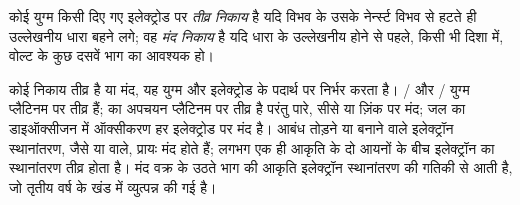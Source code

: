 \begin{definition}[तीव्र और मंद निकाय]\label{def:b2:current-potential-curves:fast-slow}
कोई युग्म किसी दिए गए इलेक्ट्रोड पर \emph{तीव्र निकाय} है यदि
विभव के उसके नेर्न्स्ट विभव से हटते ही उल्लेखनीय धारा बहने लगे;
वह \emph{मंद निकाय} है यदि धारा के उल्लेखनीय होने से पहले, किसी भी
दिशा में, वोल्ट के कुछ दसवें भाग का  आवश्यक हो।
\end{definition}

कोई निकाय तीव्र है या मंद, यह युग्म और इलेक्ट्रोड के पदार्थ
पर निर्भर करता है। / और / युग्म प्लैटिनम पर
तीव्र हैं;  का अपचयन प्लैटिनम पर तीव्र है परंतु पारे,
सीसे या ज़िंक पर मंद; जल का डाइऑक्सीजन में ऑक्सीकरण हर इलेक्ट्रोड पर मंद है।
आबंध तोड़ने या बनाने वाले इलेक्ट्रॉन स्थानांतरण, जैसे  या  वाले,
प्रायः मंद होते हैं; लगभग एक ही आकृति के दो आयनों के बीच इलेक्ट्रॉन का
स्थानांतरण तीव्र होता है। मंद वक्र के उठते भाग की आकृति इलेक्ट्रॉन स्थानांतरण की
गतिकी से आती है, जो तृतीय वर्ष के खंड में व्युत्पन्न की गई है।

